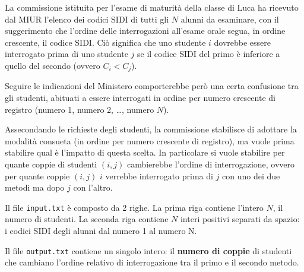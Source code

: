 \usepackage{xcolor}
\usepackage{afterpage}
\usepackage{pifont,mdframed}
\usepackage[bottom]{footmisc}
\usepackage{hyperref}

\makeatletter
\gdef\this@inputfilename{input.txt}
\gdef\this@outputfilename{output.txt}
\makeatother

\newcommand{\inputfile}{\texttt{input.txt}}
\newcommand{\outputfile}{\texttt{output.txt}}

\newenvironment{warning}
  {\par\begin{mdframed}[linewidth=2pt,linecolor=gray]%
    \begin{list}{}{\leftmargin=1cm
                   \labelwidth=\leftmargin}\item[\Large\ding{43}]}
  {\end{list}\end{mdframed}\par}

    La commissione istituita per l'esame di maturità della classe di Luca ha ricevuto dal MIUR l'elenco dei codici SIDI di tutti gli $N$ alunni da esaminare, con il suggerimento che l'ordine delle interrogazioni all'esame orale segua, in ordine crescente, il codice SIDI. Ciò significa che uno studente $i$ dovrebbe essere interrogato prima di uno studente $j$ se il codice SIDI del primo è inferiore a quello del secondo (ovvero $C_i < C_j$).

    Seguire le indicazioni del Ministero comporterebbe però una certa confusione tra gli studenti, abituati a essere interrogati in ordine per numero crescente di registro (numero 1, numero 2, \ldots, numero $N$).

    Assecondando le richieste degli studenti, la commissione stabilisce di adottare la modalità consueta (in ordine per numero crescente di registro), ma vuole prima stabilire qual è l'impatto di questa scelta. In particolare si vuole stabilire per quante coppie di studenti $(i, j)$ cambierebbe l'ordine di interrogazione, ovvero per quante coppie $(i, j)$ $i$ verrebbe interrogato prima di $j$ con uno dei due metodi ma dopo $j$ con l'altro.

\InputFile
Il file \inputfile{} è composto da 2 righe. La prima riga contiene l'intero $N$, il numero di studenti.
La seconda riga contiene $N$ interi positivi separati da spazio: i codici SIDI degli alunni dal numero 1 al numero N.

\OutputFile
Il file \outputfile{} contiene un singolo intero: il \textbf{numero di coppie} di studenti che cambiano l'ordine relativo di interrogazione tra il primo e il secondo metodo.

